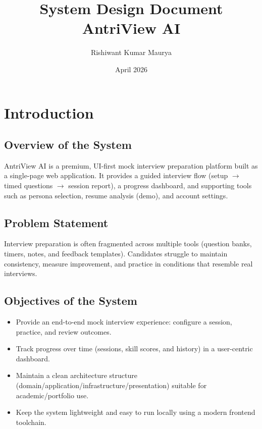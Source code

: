\documentclass[11pt]{article}
\title{\textbf{System Design Document}\\AntriView AI}
\author{Rishiwant Kumar Maurya}
\date{April 2026}
\begin{document}
\maketitle
\tableofcontents
\newpage

\section{Introduction}

\subsection{Overview of the System}
AntriView AI is a premium, UI-first mock interview preparation platform built as a single-page web application.
It provides a guided interview flow (setup \(\rightarrow\) timed questions \(\rightarrow\) session report), a progress dashboard, and supporting tools such as persona selection, resume analysis (demo), and account settings.

\subsection{Problem Statement}
Interview preparation is often fragmented across multiple tools (question banks, timers, notes, and feedback templates).
Candidates struggle to maintain consistency, measure improvement, and practice in conditions that resemble real interviews.

\subsection{Objectives of the System}
\begin{itemize}[leftmargin=1.2em]
  \item Provide an end-to-end mock interview experience: configure a session, practice, and review outcomes.
  \item Track progress over time (sessions, skill scores, and history) in a user-centric dashboard.
  \item Maintain a clean architecture structure (domain/application/infrastructure/presentation) suitable for academic/portfolio use.
  \item Keep the system lightweight and easy to run locally using a modern frontend toolchain.
\end{itemize}

\end{document}
